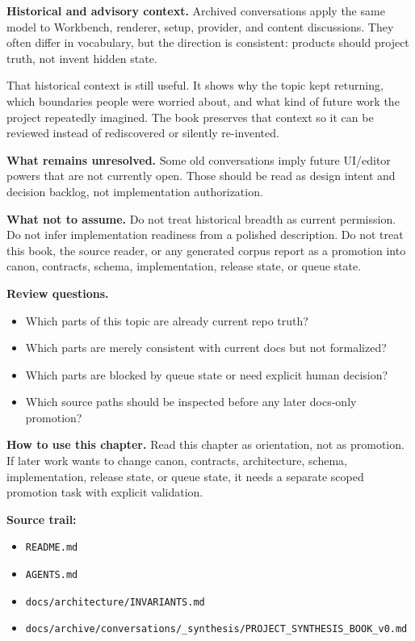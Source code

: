 \documentclass[10.5pt,a4paper,openany]{book}
\begin{document}
\textbf{Historical and advisory context.} Archived conversations apply the same model to Workbench, renderer, setup, provider, and content discussions.\allowbreak{} They often differ in vocabulary, but the direction is consistent: products should project truth, not invent hidden state.\allowbreak{}


That historical context is still useful.\allowbreak{} It shows why the topic kept returning, which boundaries people were worried about, and what kind of future work the project repeatedly imagined.\allowbreak{} The book preserves that context so it can be reviewed instead of rediscovered or silently re-\allowbreak{}invented.\allowbreak{}


\textbf{What remains unresolved.} Some old conversations imply future UI/\allowbreak{}editor powers that are not currently open.\allowbreak{} Those should be read as design intent and decision backlog, not implementation authorization.\allowbreak{}


\textbf{What not to assume.} Do not treat historical breadth as current permission.\allowbreak{} Do not infer implementation readiness from a polished description.\allowbreak{} Do not treat this book, the source reader, or any generated corpus report as a promotion into canon, contracts, schema, implementation, release state, or queue state.\allowbreak{}


\textbf{Review questions.}


\begin{itemize}
\item Which parts of this topic are already current repo truth?
\item Which parts are merely consistent with current docs but not formalized?
\item Which parts are blocked by queue state or need explicit human decision?
\item Which source paths should be inspected before any later docs-\allowbreak{}only promotion?
\end{itemize}

\textbf{How to use this chapter.} Read this chapter as orientation, not as promotion.\allowbreak{} If later work wants to change canon, contracts, architecture, schema, implementation, release state, or queue state, it needs a separate scoped promotion task with explicit validation.\allowbreak{}


\textbf{Source trail:}


\begin{itemize}
\item \texttt{README.\allowbreak{}md}
\item \texttt{AGENTS.\allowbreak{}md}
\item \texttt{docs/\allowbreak{}architecture/\allowbreak{}INVARIANTS.\allowbreak{}md}
\item \texttt{docs/\allowbreak{}archive/\allowbreak{}conversations/\allowbreak{}\_\allowbreak{}synthesis/\allowbreak{}PROJECT\_\allowbreak{}SYNTHESIS\_\allowbreak{}BOOK\_\allowbreak{}v0.\allowbreak{}md}
\end{itemize}
\end{document}

